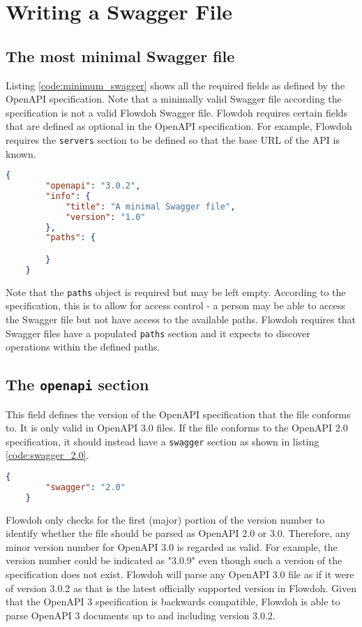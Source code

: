\section{Writing a Swagger File}
\subsection{The most minimal Swagger file}
Listing \ref{code:minimum_swagger} shows all the required fields as defined by the OpenAPI specification. Note that a minimally valid Swagger file according the specification is not a valid Flowdoh Swagger file. Flowdoh requires certain fields that are defined as optional in the OpenAPI specification. For example, Flowdoh requires the \texttt{servers} section to be defined so that the base URL of the API is known.
\begin{lstlisting}[caption={A minimal OpenAPI 3.0 definition},label={code:minimum_swagger},language=json]
    {
        "openapi": "3.0.2",
        "info": {
            "title": "A minimal Swagger file",
            "version": "1.0"
        },
        "paths": {

        }
    }
\end{lstlisting}
Note that the \texttt{paths} object is required but may be left empty. According to the specification, this is to allow for access control \cite{empty_paths} - a person may be able to access the Swagger file but not have access to the available paths. Flowdoh requires that Swagger files have a populated \texttt{paths} section and it expects to discover operations within the defined paths.
\subsection{The \texttt{openapi} section}
This field defines the version of the OpenAPI specification that the file conforms to. It is only valid in OpenAPI 3.0 files. If the file conforms to the OpenAPI 2.0 specification, it should instead have a \texttt{swagger} section as shown in listing \ref{code:swagger_2.0}.
\begin{lstlisting}[caption={Alternative to the \texttt{openapi} section in OpenAPI 2.0},label={code:swagger_2.0},language=json]
    {
        "swagger": "2.0"
    }
\end{lstlisting}
Flowdoh only checks for the first (major) portion of the version number to identify whether the file should be parsed as OpenAPI 2.0 or 3.0. Therefore, any minor version number for OpenAPI 3.0 is regarded as valid. For example, the version number could be indicated as "3.0.9" even though such a version of the specification does not exist. Flowdoh will parse any OpenAPI 3.0 file as if it were of version 3.0.2 as that is the latest officially supported version in Flowdoh. Given that the OpenAPI 3 specification is backwards compatible, Flowdoh is able to parse OpenAPI 3 documents up to and including version 3.0.2.
